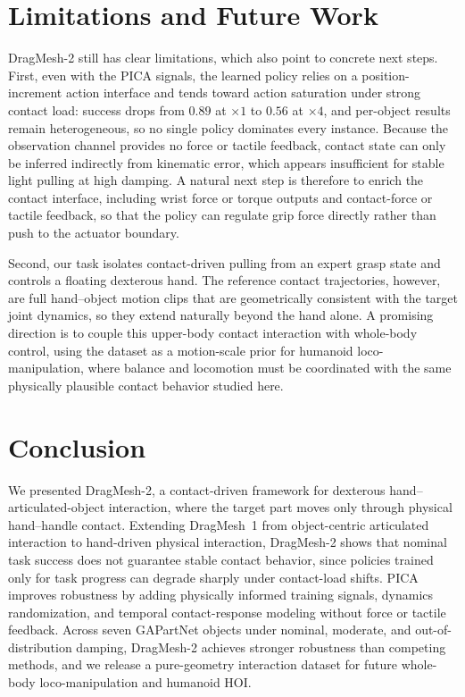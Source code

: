 \documentclass{article}
\begin{document}
\section{Limitations and Future Work}


DragMesh-2 still has clear limitations, which also point to concrete next steps. First, even with the PICA signals, the learned policy relies on a position-increment action interface and tends toward action saturation under strong contact load: success drops
from $0.89$ at $\times1$ to $0.56$ at $\times4$, and per-object results remain heterogeneous, so no single policy dominates every instance. Because the observation channel provides no force or tactile feedback, contact state can only be inferred indirectly from kinematic error, which appears insufficient for stable light pulling
at high damping. A natural next step is therefore to enrich the contact interface, including wrist force or torque outputs and contact-force or tactile feedback, so that the policy can regulate grip force directly rather than push to the actuator boundary.

Second, our task isolates contact-driven pulling from an expert grasp state and controls a floating dexterous hand. The reference contact
trajectories, however, are full hand--object motion clips that are geometrically consistent with the target joint dynamics, so they extend naturally beyond the hand alone. A promising direction is to couple this upper-body contact interaction with whole-body control, using the dataset as a motion-scale prior for humanoid loco-manipulation, where balance and locomotion must be coordinated with the same physically plausible contact behavior studied here.




\section{Conclusion}
\label{sec:conclusion}

We presented DragMesh-2, a contact-driven framework for dexterous hand--articulated-object interaction, where the target part moves only through physical hand--handle contact. Extending DragMesh~1 from object-centric articulated interaction to hand-driven physical interaction, DragMesh-2 shows that nominal task success does not guarantee stable contact behavior, since policies trained only for task progress can degrade sharply under contact-load shifts. PICA improves robustness by adding physically informed training signals, dynamics randomization, and temporal contact-response modeling without force or tactile feedback. Across seven GAPartNet objects under nominal, moderate, and out-of-distribution damping, DragMesh-2 achieves stronger robustness than competing methods, and we release a pure-geometry interaction dataset for future whole-body loco-manipulation and humanoid HOI.
\end{document}
